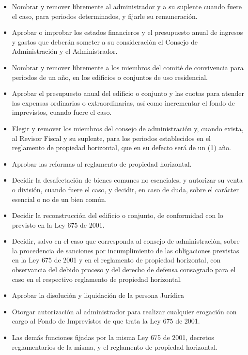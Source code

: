 \begin{itemize}
\begin{itemize}
\item Nombrar y remover libremente al administrador y a su suplente cuando fuere el caso, para periodos determinados, y fijarle su remuneración.
\item Aprobar o improbar los estados financieros y el presupuesto anual de ingresos y gastos que deberán someter a su consideración el Consejo de Administración y el Administrador.
\item Nombrar y remover libremente a los miembros del comité de convivencia para periodos de un año, en los edificios o conjuntos de uso residencial.
\item Aprobar el presupuesto anual del edificio o conjunto y las cuotas para atender las expensas ordinarias o extraordinarias, así como incrementar el fondo de imprevistos, cuando fuere el caso.
\item Elegir y remover los miembros del consejo de administración y, cuando exista, al Revisor Fiscal y su suplente, para los periodos establecidos en el reglamento de propiedad horizontal, que en su defecto será de un (1) año.
\item Aprobar las reformas al reglamento de propiedad horizontal.
\item Decidir la desafectación de bienes comunes no esenciales, y autorizar su venta o división, cuando fuere el caso, y decidir, en caso de duda, sobre el carácter esencial o no de un bien común.
\item Decidir la reconstrucción del edificio o conjunto, de conformidad con lo previsto en la Ley 675 de 2001.
\item Decidir, salvo en el caso que corresponda al consejo de administración, sobre la procedencia de sanciones por incumplimiento de las obligaciones previstas en la Ley 675 de 2001 y en el reglamento de propiedad horizontal, con observancia del debido proceso y del derecho de defensa consagrado para el caso en el respectivo reglamento de propiedad horizontal.
\item Aprobar la disolución y liquidación de la persona Jurídica
\item Otorgar autorización al administrador para realizar cualquier erogación con cargo al Fondo de Imprevistos de que trata la Ley 675 de 2001.
\item Las demás funciones fijadas por la misma Ley 675 de 2001, decretos reglamentarios de la misma, y el reglamento de propiedad horizontal.
\end{itemize}


\end{itemize}
